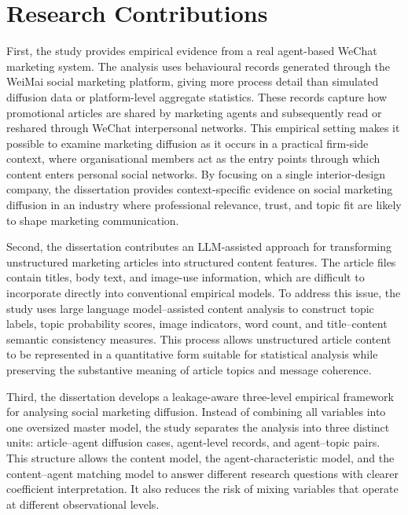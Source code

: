 \section{Research Contributions}
\label{sec:1-4-research-contributions}

First, the study provides empirical evidence from a real agent-based WeChat marketing system. The analysis uses behavioural records generated through the WeiMai social marketing platform, giving more process detail than simulated diffusion data or platform-level aggregate statistics. These records capture how promotional articles are shared by marketing agents and subsequently read or reshared through WeChat interpersonal networks. This empirical setting makes it possible to examine marketing diffusion as it occurs in a practical firm-side context, where organisational members act as the entry points through which content enters personal social networks. By focusing on a single interior-design company, the dissertation provides context-specific evidence on social marketing diffusion in an industry where professional relevance, trust, and topic fit are likely to shape marketing communication.

Second, the dissertation contributes an LLM-assisted approach for transforming unstructured marketing articles into structured content features. The article files contain titles, body text, and image-use information, which are difficult to incorporate directly into conventional empirical models. To address this issue, the study uses large language model–assisted content analysis to construct topic labels, topic probability scores, image indicators, word count, and title–content semantic consistency measures. This process allows unstructured article content to be represented in a quantitative form suitable for statistical analysis while preserving the substantive meaning of article topics and message coherence.

Third, the dissertation develops a leakage-aware three-level empirical framework for analysing social marketing diffusion. Instead of combining all variables into one oversized master model, the study separates the analysis into three distinct units: article–agent diffusion cases, agent-level records, and agent–topic pairs. This structure allows the content model, the agent-characteristic model, and the content–agent matching model to answer different research questions with clearer coefficient interpretation. It also reduces the risk of mixing variables that operate at different observational levels.

